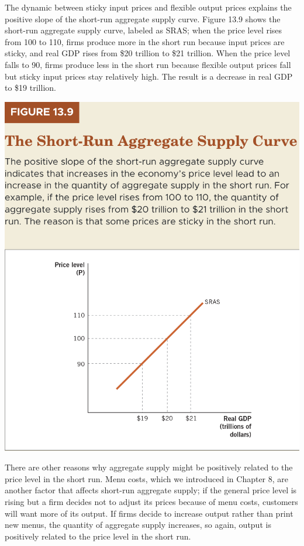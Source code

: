 \documentclass[11pt]{article} %
\begin{document}
The dynamic between sticky input prices and flexible output prices explains the positive slope of the short-run aggregate supply curve. Figure 13.9 shows the short-run aggregate supply curve, labeled as SRAS; when the price level rises from 100 to 110, firms produce more in the short run because input prices are sticky, and real GDP rises from \$20 trillion to \$21 trillion. When the price level falls to 90, firms produce less in the short run because flexible output prices fall but sticky input prices stay relatively high. The result is a decrease in real GDP to \$19 trillion.

\begin{center}
\includegraphics[scale=0.45]{images/Figure 13.9.png} 
\end{center}

There are other reasons why aggregate supply might be positively related to the price level in the short run. Menu costs, which we introduced in Chapter 8, are another factor that affects short-run aggregate supply; if the general price level is rising but a firm decides not to adjust its prices because of menu costs, customers will want more of its output. If firms decide to increase output rather than print new menus, the quantity of aggregate supply increases, so again, output is positively related to the price level in the short run.
\end{document}
